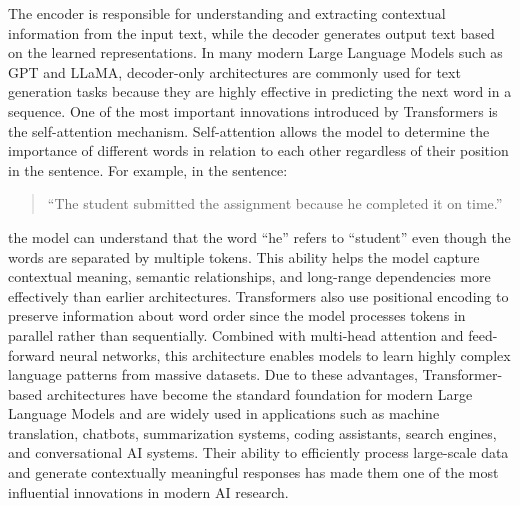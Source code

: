 \documentclass[12pt, a4paper, onecolumn]{report}
\begin{document}
The encoder is responsible for understanding and extracting contextual information from the input text, while the decoder generates output text based on the learned representations. In many modern Large Language Models such as GPT and LLaMA, decoder-only architectures are commonly used for text generation tasks because they are highly effective in predicting the next word in a sequence. One of the most important innovations introduced by Transformers is the self-attention mechanism. Self-attention allows the model to determine the importance of different words in relation to each other regardless of their position in the sentence. For example, in the sentence:
\begin{quote}
``The student submitted the assignment because he completed it on time.''
\end{quote}
the model can understand that the word “he” refers to “student” even though the words are separated by multiple tokens. This ability helps the model capture contextual meaning, semantic relationships, and long-range dependencies more effectively than earlier architectures. Transformers also use positional encoding to preserve information about word order since the model processes tokens in parallel rather than sequentially. Combined with multi-head attention and feed-forward neural networks, this architecture enables models to learn highly complex language patterns from massive datasets. Due to these advantages, Transformer-based architectures have become the standard foundation for modern Large Language Models and are widely used in applications such as machine translation, chatbots, summarization systems, coding assistants, search engines, and conversational AI systems. Their ability to efficiently process large-scale data and generate contextually meaningful responses has made them one of the most influential innovations in modern AI research.
\end{document}
